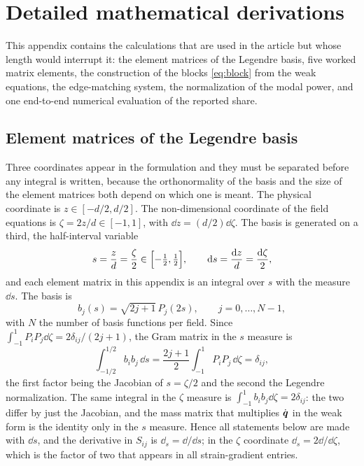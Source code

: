 \section{Detailed mathematical derivations}
\label{app:derivations}

This appendix contains the calculations that are used in the article but whose
length would interrupt it: the element matrices of the Legendre basis, five
worked matrix elements, the construction of the blocks \eqref{eq:block} from the
weak equations, the edge-matching system, the normalization of the modal power,
and one end-to-end numerical evaluation of the reported share.

\subsection{Element matrices of the Legendre basis}

Three coordinates appear in the formulation and they must be separated before
any integral is written, because the orthonormality of the basis and the size of
the element matrices both depend on which one is meant.  The physical coordinate
is $z\in[-d/2,d/2]$.  The non-dimensional coordinate of the field equations is
$\zeta=2z/d\in[-1,1]$, with $\dd z=(d/2)\dd\zeta$.  The basis is generated on a
third, the half-interval variable
\begin{equation}
\label{eq:app_measures}
s=\frac{z}{d}=\frac{\zeta}{2}\in\Bigl[-\tfrac12,\tfrac12\Bigr],
\qquad
\mathrm{d} s=\frac{\mathrm{d} z}{d}=\frac{\mathrm{d}\zeta}{2},
\end{equation}
and each element matrix in this appendix is an integral over $s$ with the
measure $\dd s$.  The basis is
\begin{equation}
\label{eq:app_basis}
b_j(s)=\sqrt{2j+1}\,P_j(2s),\qquad j=0,\dots,N-1,
\end{equation}
with $N$ the number of basis functions per field.  Since
$\int_{-1}^{1}P_iP_j\dd\zeta=2\delta_{ij}/(2j+1)$, the Gram matrix in the $s$
measure is
\begin{equation}
\label{eq:app_mass}
\int_{-1/2}^{1/2}b_ib_j\,\dd s
=\frac{2j+1}{2}\int_{-1}^{1}P_iP_j\,\dd\zeta=\delta_{ij},
\end{equation}
the first factor being the Jacobian of $s=\zeta/2$ and the second the Legendre
normalization.  The same integral in the $\zeta$ measure is
$\int_{-1}^{1}b_ib_j\dd\zeta=2\delta_{ij}$: the two differ by just the Jacobian, and the mass matrix that multiplies $\dot{\boldsymbol{q}}$ in the weak form is
the identity only in the $s$ measure.  Hence all statements below are made with $\dd s$, and the derivative in $S_{ij}$ is $\dd_s=\dd/\dd s$; in the $\zeta$
coordinate $\dd_s=2\dd/\dd\zeta$, which is the factor of two that appears in all strain-gradient entries.

